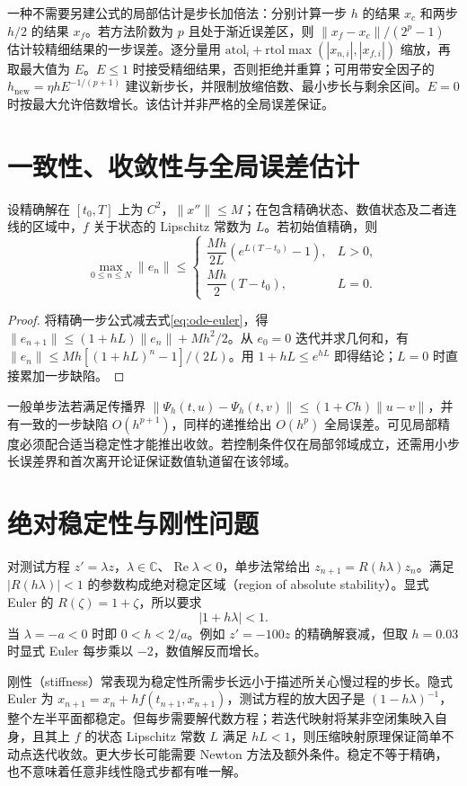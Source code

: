一种不需要另建公式的局部估计是步长加倍法：分别计算一步 $h$ 的结果 $x_c$ 和两步 $h/2$ 的结果 $x_f$。若方法阶数为 $p$ 且处于渐近误差区，则 $\|x_f-x_c\|/(2^p-1)$ 估计较精细结果的一步误差。逐分量用 $\mathrm{atol}_i+\mathrm{rtol}\max(|x_{n,i}|,|x_{f,i}|)$ 缩放，再取最大值为 $E$。$E\leq1$ 时接受精细结果，否则拒绝并重算；可用带安全因子的 $h_{\mathrm{new}}=\eta h E^{-1/(p+1)}$ 建议新步长，并限制放缩倍数、最小步长与剩余区间。$E=0$ 时按最大允许倍数增长。该估计并非严格的全局误差保证。

\section{一致性、收敛性与全局误差估计}
\begin{theorem}
设精确解在 $[t_0,T]$ 上为 $C^2$，$\|x''\|\leq M$；在包含精确状态、数值状态及二者连线的区域中，$f$ 关于状态的 Lipschitz 常数为 $L$。若初始值精确，则
\[
 \max_{0\leq n\leq N}\|e_n\|\leq
 \begin{cases}\dfrac{Mh}{2L}(e^{L(T-t_0)}-1),&L>0,\\
 \dfrac{Mh}{2}(T-t_0),&L=0.
 \end{cases}
\]
\end{theorem}
\begin{proof}
将精确一步公式减去式\eqref{eq:ode-euler}，得 $\|e_{n+1}\|\leq(1+hL)\|e_n\|+Mh^2/2$。从 $e_0=0$ 迭代并求几何和，有 $\|e_n\|\leq Mh[(1+hL)^n-1]/(2L)$。用 $1+hL\leq e^{hL}$ 即得结论；$L=0$ 时直接累加一步缺陷。
\end{proof}

一般单步法若满足传播界 $\|\Psi_h(t,u)-\Psi_h(t,v)\|\leq(1+Ch)\|u-v\|$，并有一致的一步缺陷 $O(h^{p+1})$，同样的递推给出 $O(h^p)$ 全局误差。可见局部精度必须配合适当稳定性才能推出收敛。若控制条件仅在局部邻域成立，还需用小步长误差界和首次离开论证保证数值轨道留在该邻域。

\section{绝对稳定性与刚性问题}
对测试方程 $z'=\lambda z$，$\lambda\in\mathbb C$、$\operatorname{Re}\lambda<0$，单步法常给出 $z_{n+1}=R(h\lambda)z_n$。满足 $|R(h\lambda)|<1$ 的参数构成绝对稳定区域（region of absolute stability）。显式 Euler 的 $R(\zeta)=1+\zeta$，所以要求
\[
 |1+h\lambda|<1.
\]
当 $\lambda=-a<0$ 时即 $0<h<2/a$。例如 $z'=-100z$ 的精确解衰减，但取 $h=0.03$ 时显式 Euler 每步乘以 $-2$，数值解反而增长。

刚性（stiffness）常表现为稳定性所需步长远小于描述所关心慢过程的步长。隐式 Euler 为 $x_{n+1}=x_n+hf(t_{n+1},x_{n+1})$，测试方程的放大因子是 $(1-h\lambda)^{-1}$，整个左半平面都稳定。但每步需要解代数方程；若迭代映射将某非空闭集映入自身，且其上 $f$ 的状态 Lipschitz 常数 $L$ 满足 $hL<1$，则压缩映射原理保证简单不动点迭代收敛。更大步长可能需要 Newton 方法及额外条件。稳定不等于精确，也不意味着任意非线性隐式步都有唯一解。

